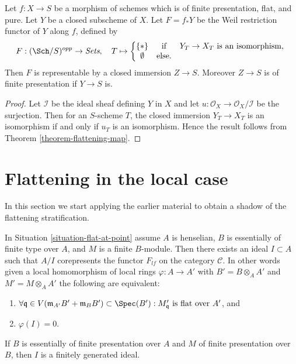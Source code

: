 \begin{lemma}
\label{lemma-Weil-restriction-closed-subschemes}
Let $f:X\to S$ be a morphism of schemes which is of finite presentation,
flat, and pure. Let $Y$ be a closed subscheme of $X$. Let $F=f_*Y$ be the
Weil restriction functor of $Y$ along $f$, defined by
$$
F : (\Sch/S)^{opp} \to \textit{Sets}, \quad
T \mapsto
\left\{
\begin{matrix}
\{*\} & \text{if} & Y_T\to X_T \text{ is an isomorphism, }\\
\emptyset & \text{else.} &
\end{matrix}
\right.
$$
Then $F$ is representable by a closed immersion $Z\to S$. Moreover
$Z\to S$ is of finite presentation if $Y\to S$ is.
\end{lemma}

\begin{proof}
Let $\mathcal{I}$ be the ideal sheaf defining $Y$ in $X$ and let
$u:\mathcal{O}_X\to\mathcal{O}_X/\mathcal{I}$ be the surjection.
Then for an $S$-scheme $T$, the closed immersion $Y_T\to X_T$
is an isomorphism if and only if $u_T$ is an isomorphism. Hence
the result follows from
Theorem \ref{theorem-flattening-map}.
\end{proof}



\section{Flattening in the local case}
\label{section-flattening-local}

\noindent
In this section we start applying the earlier material to obtain a
shadow of the flattening stratification.

\begin{theorem}
\label{theorem-flattening-local}
In
Situation \ref{situation-flat-at-point}
assume $A$ is henselian, $B$ is essentially of finite type over $A$, and
$M$ is a finite $B$-module. Then there exists an ideal
$I \subset A$ such that $A/I$ corepresents the functor $F_{lf}$ on the category
$\mathcal{C}$. In other words given a local homomorphism of local rings
$\varphi : A \to A'$ with $B' = B \otimes_A A'$ and $M' = M \otimes_A A'$
the following are equivalent:
\begin{enumerate}
\item $\forall \mathfrak q \in V(\mathfrak m_{A'}B' + \mathfrak m_B B')
\subset \Spec(B') :
M'_{\mathfrak q}\text{ is flat over }A'$, and
\item $\varphi(I) = 0$.
\end{enumerate}
If $B$ is essentially of finite presentation over $A$ and $M$
of finite presentation over $B$, then $I$ is a finitely generated ideal.
\end{theorem}

